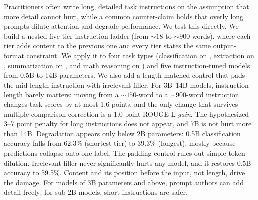 Practitioners often write long, detailed task instructions on the assumption that more detail cannot hurt, while a common counter-claim holds that overly long prompts dilute attention and degrade performance.
We test this directly.
We build a nested five-tier instruction ladder (from ${\sim}18$ to ${\sim}900$ words), where each tier adds content to the previous one and every tier states the same output-format constraint.
We apply it to four task types (classification on \agnews, extraction on \squad, summarization on \cnndm, and math reasoning on \gsm) and five instruction-tuned \qwen models from 0.5B to 14B parameters.
We also add a length-matched control that pads the mid-length instruction with irrelevant filler.
For 3B--14B models, instruction length barely matters: moving from a ${\sim}150$-word to a ${\sim}900$-word instruction changes task scores by at most 1.6 points, and the only change that survives multiple-comparison correction is a 1.0-point ROUGE-L \emph{gain}.
The hypothesized 3--7 point penalty for long instructions does not appear, and 7B is not hurt more than 14B.
Degradation appears only below 2B parameters: 0.5B classification accuracy falls from 62.3\% (shortest tier) to 39.3\% (longest), mostly because predictions collapse onto one label.
The padding control rules out simple token dilution. Irrelevant filler never significantly hurts any model, and it restores 0.5B accuracy to 59.5\%.
Content and its position before the input, not length, drive the damage.
For models of 3B parameters and above, prompt authors can add detail freely; for sub-2B models, short instructions are safer.
